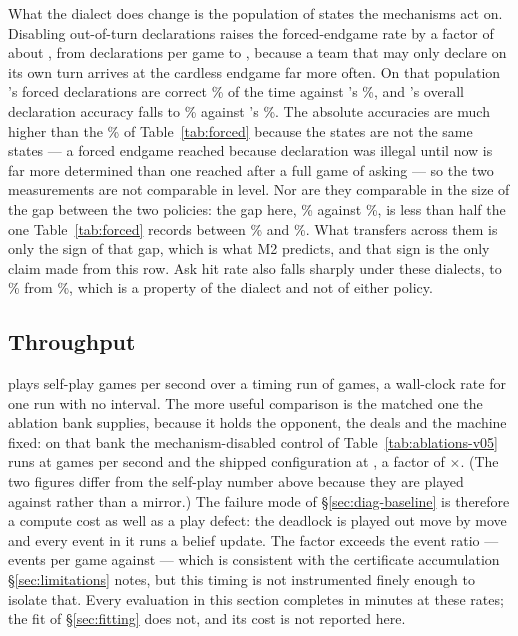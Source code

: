 What the dialect does change is the population of states the mechanisms act on. Disabling out-of-turn declarations raises the
forced-endgame rate by a factor of about \numDialectForcedRatio{}, from
\numDialectDefaultForcedRate{} declarations per game to
\numDialectNoOOTForcedRate{}, because a team that may only declare on its own
turn arrives at the cardless endgame far more often. On that population
\vfive{}'s forced declarations are correct \numDialectNoOOTForcedFive\% of the
time against \vfour{}'s \numDialectNoOOTForcedFour\%, and \vfour{}'s overall
declaration accuracy falls to \numDialectNoOOTDeclFour\% against \vfive{}'s
\numDialectNoOOTDeclFive\%. The absolute accuracies are much higher than the
\numVfiveForcedAcc\% of Table~\ref{tab:forced} because the states are not the
same states --- a forced endgame reached because declaration was illegal until
now is far more determined than one reached after a full game of asking --- so
the two measurements are not comparable in level. Nor are they comparable in the
size of the gap between the two policies: the gap here, \numDialectNoOOTForcedFive\%
against \numDialectNoOOTForcedFour\%, is less than half the one
Table~\ref{tab:forced} records between \numVfiveForcedAcc\% and
\numVfourForcedAcc\%. What transfers across them is only the sign of that gap,
which is what M2 predicts, and that sign is the only claim made from this row. Ask hit rate also falls sharply under
these dialects, to \numDialectNoOOTHit\% from \numDialectDefaultHit\%, which is a
property of the dialect and not of either policy.

\subsection{Throughput}
\label{sec:results-throughput}

\vfive{} plays \numThroughputFive{} self-play games per second over a timing run
of \numThroughputGamesFive{} games, a wall-clock rate for one run with no
interval. The more useful comparison is the matched one the ablation bank
supplies, because it holds the opponent, the deals and the machine fixed: on that
bank the mechanism-disabled control of Table~\ref{tab:ablations-v05} runs at
\numThroughputPatho{} games per second and the shipped configuration at
\numThroughputFixed{}, a factor of \numThroughputRatioFive$\times$. (The two
figures differ from the self-play number above because they are played against
\vfour{} rather than a mirror.) The failure mode of \S\ref{sec:diag-baseline} is
therefore a compute cost as well as a play defect: the deadlock is played out move
by move and every event in it runs a belief update. The factor exceeds the event
ratio --- \numAblControlEvents{} events per game against \numAblFullEvents{} ---
which is consistent with the certificate accumulation \S\ref{sec:limitations}
notes, but this timing is not instrumented finely enough to isolate that. Every
evaluation in this section completes in minutes at these rates; the fit of
\S\ref{sec:fitting} does not, and its cost is not reported here.

